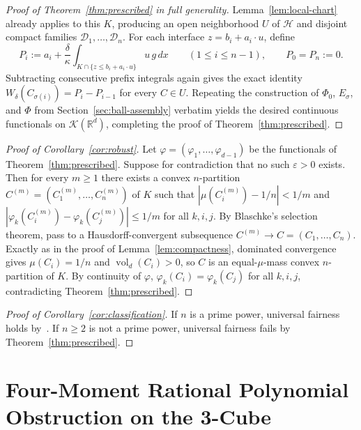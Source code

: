 \documentclass[11pt,a4paper]{amsart}
\numberwithin{equation}{section}
\theoremstyle{definition}
\newcommand{\R}{\mathbb{R}}
\newcommand{\Kcal}{\mathcal{K}}
\newcommand{\Hcal}{\mathcal{H}}
\newcommand{\Dcal}{\mathcal{D}}
\newcommand{\vol}{\operatorname{vol}}
\begin{document}
\begin{proof}[Proof of Theorem~\ref{thm:prescribed} in full generality]
Lemma~\ref{lem:local-chart} already applies to this $K$, producing an open neighborhood $U$ of $\Hcal$ and disjoint compact families $\Dcal_1, \dots, \Dcal_n$. For each interface $z = b_i + a_i \cdot u$, define
\[
P_i := a_i + \frac{\delta}{\kappa} \int_{K \cap \{z \le b_i + a_i \cdot u\}} u\, g\, dx \qquad (1 \le i \le n-1), \qquad P_0 = P_n := 0.
\]
Subtracting consecutive prefix integrals again gives the exact identity $W_\delta(C_{\sigma(i)}) = P_i - P_{i-1}$ for every $C \in U$. Repeating the construction of $\Phi_0$, $E_\sigma$, and $\Phi$ from Section~\ref{sec:ball-assembly} verbatim yields the desired continuous functionals on $\Kcal(\R^d)$, completing the proof of Theorem~\ref{thm:prescribed}.
\end{proof}

\begin{proof}[Proof of Corollary~\ref{cor:robust}]
Let $\varphi = (\varphi_1, \dots, \varphi_{d-1})$ be the functionals of Theorem~\ref{thm:prescribed}. Suppose for contradiction that no such $\varepsilon > 0$ exists. Then for every $m \ge 1$ there exists a convex $n$-partition $C^{(m)} = (C_1^{(m)}, \dots, C_n^{(m)})$ of $K$ such that $|\mu(C_i^{(m)}) - 1/n| < 1/m$ and $|\varphi_k(C_i^{(m)}) - \varphi_k(C_j^{(m)})| \le 1/m$ for all $k, i, j$. By Blaschke's selection theorem, pass to a Hausdorff-convergent subsequence $C^{(m)} \to C = (C_1, \dots, C_n)$. Exactly as in the proof of Lemma~\ref{lem:compactness}, dominated convergence gives $\mu(C_i) = 1/n$ and $\vol_d(C_i) > 0$, so $C$ is an equal-$\mu$-mass convex $n$-partition of $K$. By continuity of $\varphi$, $\varphi_k(C_i) = \varphi_k(C_j)$ for all $k, i, j$, contradicting Theorem~\ref{thm:prescribed}.
\end{proof}

\begin{proof}[Proof of Corollary~\ref{cor:classification}]
If $n$ is a prime power, universal fairness holds by~\cite{KHA2014,BZ2014}. If $n \ge 2$ is not a prime power, universal fairness fails by Theorem~\ref{thm:prescribed}.
\end{proof}

\section{Four-Moment Rational Polynomial Obstruction on the 3-Cube}
\label{sec:cube-3d}
\end{document}
